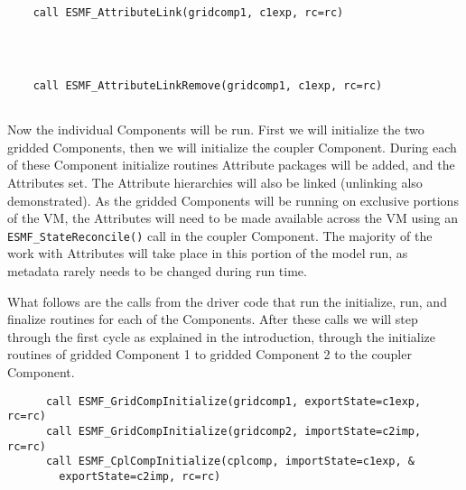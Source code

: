 
 \begin{verbatim}


    call ESMF_AttributeLink(gridcomp1, c1exp, rc=rc)
 
\end{verbatim}
 

 \begin{verbatim}


    call ESMF_AttributeLinkRemove(gridcomp1, c1exp, rc=rc)
 
\end{verbatim}
 

   Now the individual Components will be run.  First we will initialize the two
   gridded Components, then we will initialize the coupler Component.
   During each of these Component initialize routines Attribute
   packages will be added, and the Attributes set.  The Attribute
   hierarchies will also be linked (unlinking also demonstrated).  As the
   gridded Components will be running on exclusive portions of the VM, the
   Attributes will need to be made available across the VM using an
   {\tt ESMF\_StateReconcile()} call in the coupler Component.  The majority of
   the work with Attributes will take place in this portion of the model run, as
   metadata rarely needs to be changed during run time.
  
   What
   follows are the calls from the driver code that run the initialize, run, and finalize routines
   for each of the Components.  After these calls we will step through the first
   cycle as explained in the introduction, through the initialize routines of
   gridded Component 1 to gridded Component 2 to the coupler Component. 

 \begin{verbatim}
      call ESMF_GridCompInitialize(gridcomp1, exportState=c1exp, rc=rc)
      call ESMF_GridCompInitialize(gridcomp2, importState=c2imp, rc=rc)
      call ESMF_CplCompInitialize(cplcomp, importState=c1exp, &
        exportState=c2imp, rc=rc)
 
\end{verbatim}
 

